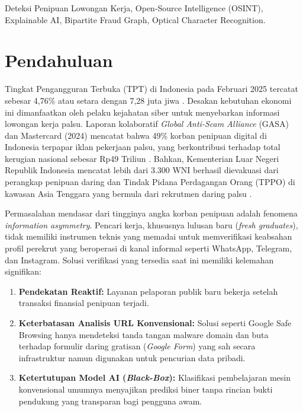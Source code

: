 \documentclass[conference]{IEEEtran}
\begin{document}
\begin{IEEEkeywords}
Deteksi Penipuan Lowongan Kerja, Open-Source Intelligence (OSINT), Explainable AI, Bipartite Fraud Graph, Optical Character Recognition.
\end{IEEEkeywords}

\section{Pendahuluan}
Tingkat Pengangguran Terbuka (TPT) di Indonesia pada Februari 2025 tercatat sebesar 4,76\% atau setara dengan 7,28 juta jiwa \cite{bps2025}. Desakan kebutuhan ekonomi ini dimanfaatkan oleh pelaku kejahatan siber untuk menyebarkan informasi lowongan kerja palsu. Laporan kolaboratif \textit{Global Anti-Scam Alliance} (GASA) dan Mastercard (2024) mencatat bahwa 49\% korban penipuan digital di Indonesia terpapar iklan pekerjaan palsu, yang berkontribusi terhadap total kerugian nasional sebesar Rp49 Triliun \cite{gasa2024}. Bahkan, Kementerian Luar Negeri Republik Indonesia mencatat lebih dari 3.300 WNI berhasil dievakuasi dari perangkap penipuan daring dan Tindak Pidana Perdagangan Orang (TPPO) di kawasan Asia Tenggara yang bermula dari rekrutmen daring palsu \cite{kemlu2024}.

Permasalahan mendasar dari tingginya angka korban penipuan adalah fenomena \textit{information asymmetry}. Pencari kerja, khususnya lulusan baru (\textit{fresh graduates}), tidak memiliki instrumen teknis yang memadai untuk memverifikasi keabsahan profil perekrut yang beroperasi di kanal informal seperti WhatsApp, Telegram, dan Instagram. Solusi verifikasi yang tersedia saat ini memiliki kelemahan signifikan:
\begin{enumerate}
    \item \textbf{Pendekatan Reaktif:} Layanan pelaporan publik baru bekerja setelah transaksi finansial penipuan terjadi.
    \item \textbf{Keterbatasan Analisis URL Konvensional:} Solusi seperti Google Safe Browsing hanya mendeteksi tanda tangan malware domain dan buta terhadap formulir daring gratisan (\textit{Google Form}) yang sah secara infrastruktur namun digunakan untuk pencurian data pribadi.
    \item \textbf{Ketertutupan Model AI (\textit{Black-Box}):} Klasifikasi pembelajaran mesin konvensional umumnya menyajikan prediksi biner tanpa rincian bukti pendukung yang transparan bagi pengguna awam.
\end{enumerate}
\end{document}
